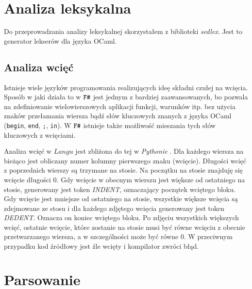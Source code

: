 \documentclass[declaration,shortabstract]{iithesis}
\begin{document}


\section{Analiza leksykalna}

Do przeprowadzania analizy leksykalnej skorzystałem z biblioteki 
\textit{sedlex}. Jest to generator lekserów dla języka OCaml.

\subsection{Analiza wcięć} \label{wciecia_omowienie}
 
Istnieje wiele języków programowania realizujących ideę składni czułej na 
wcięcia. Sposób w jaki działa to w $\verb!F#!$ jest jednym z bardziej zaawansowanych,
bo pozwala na zdefiniowanie wielowierszowych aplikacji funkcji, warunków itp. 
bez użycia znaków przełamania wiersza bądź słów kluczowych znanych 
z języka OCaml (\texttt{begin}, \texttt{end}, \texttt{;}, \texttt{in}).
 W $\verb!F#!$ 
istnieje 
także możliwość mieszania tych słów kluczowych z wcięciami. 

Analiza wcięć w $Langu$ jest zbliżona do tej w \textit{Pythonie}
\cite{python_indentation}. Dla każdego wiersza
na bieżąco jest obliczany numer kolumny pierwszego znaku (wcięcie). Długości 
wcięć z poprzednich wierszy są trzymane na stosie. Na początku na stosie
znajduję się wcięcie długości $0$. Gdy wcięcie w obecnym wierszu jest większe od 
ostatniego na stosie, generowany jest token \textit{INDENT}, oznaczający 
początek wciętego bloku. Gdy wcięcie jest mniejsze od ostatniego na stosie, 
wszystkie większe wcięcia są zdejmowane ze stosu i dla każdego zdjętego wcięcia 
generowany jest token \textit{DEDENT}. Oznacza on koniec wciętego bloku. 
Po zdjęciu 
wszystkich większych wcięć, ostatnie wcięcie, które zostanie na stosie musi być 
równe wcięciu z obecnie przetwarzanego wiersza, a w szczególności może być równe $0$. 
W przeciwnym 
przypadku kod źródłowy jest źle wcięty i kompilator zwróci błąd.

\section{Parsowanie}
\end{document}
